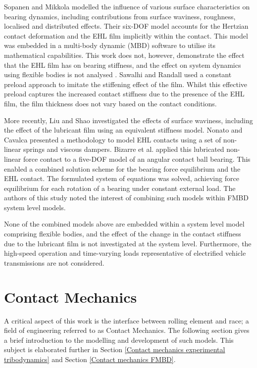 Sopanen and Mikkola \cite{Sopanen2003_1} modelled the influence of various surface characteristics on bearing dynamics, including contributions from surface waviness, roughness, localised and distributed effects. Their six-DOF model accounts for the Hertzian contact deformation and the EHL film implicitly within the contact. This model was embedded in a multi-body dynamic (MBD) software to utilise its mathematical capabilities. This work does not, however, demonstrate the effect that the EHL film has on bearing stiffness, and the effect on system dynamics using flexible bodies is not analysed \cite{Sopanen2003_2}. Sawalhi and Randall \cite{Sawalhi2008} used a constant preload approach to imitate the stiffening effect of the film. Whilst this effective preload captures the increased contact stiffness due to the presence of the EHL film, the film thickness does not vary based on the contact conditions.

More recently, Liu and Shao \cite{Liu2017b} investigated the effects of surface waviness, including the effect of the lubricant film using an equivalent stiffness model. Nonato and Cavalca \cite{Nonato2014} presented a methodology to model EHL contacts using a set of non-linear springs and viscous dampers. Bizarre et al. \cite{Bizarre2018} applied this lubricated non-linear force contact to a five-DOF model of an angular contact ball bearing. This enabled a combined solution scheme for the bearing force equilibrium and the EHL contact. The formulated system of equations was solved, achieving force equilibrium for each rotation of a bearing under constant external load. The authors of this study noted the interest of combining such models within FMBD system level models.

None of the combined models above are embedded within a system level model comprising flexible bodies, and the effect of the change in the contact stiffness due to the lubricant film is not investigated at the system level. Furthermore, the high-speed operation and time-varying loads representative of electrified vehicle transmissions are not considered.

\section{Contact Mechanics}
A critical aspect of this work is the interface between rolling element and race; a field of engineering referred to as Contact Mechanics. The following section gives a brief introduction to the modelling and development of such models. This subject is elaborated further in Section \ref{Contact mechanics experimental tribodynamics} and Section \ref{Contact mechanics FMBD}.

